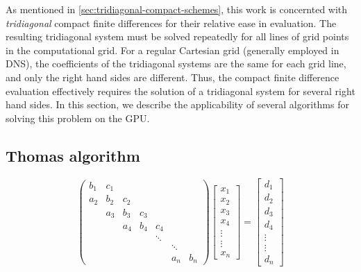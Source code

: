 As mentioned in \ref{sec:tridiagonal-compact-schemes},
this work is concernted with
\emph{tridiagonal} compact finite differences
for their relative ease in evaluation.
The resulting tridiagonal system must be solved
repeatedly for all lines of grid points in the computational grid.
For a regular Cartesian grid (generally employed in DNS),
the coefficients of the tridiagonal systems
are the same for each grid line,
and only the right hand sides are different.
Thus, the compact finite difference evaluation
effectively requires the solution of a tridiagonal system
for several right hand sides.
In this section,
we describe the applicability of several algorithms
for solving this problem on the GPU.

\subsection{Thomas algorithm}

\begin{equation} \label{eqn:general-tridiagonal-system}
\begin{pmatrix}
     b_1 & c_1  \\
     a_2 & b_2  &  c_2  \\
         & a_3  &  b_3 &  c_3  \\
         &      &  a_4 &  b_4 &  c_4  \\
         &      &      &      &  \ddots \\
         &      &      &      &     &  \ddots  \\
         &      &      &      &     &  a_n  &  b_n
\end{pmatrix}
\begin{bmatrix}
    x_1 \\
    x_2 \\
    x_3 \\
    x_4 \\
    \vdots \\
    \vdots \\
    x_n
 \end{bmatrix}
=
\begin{bmatrix}
   d_1 \\
   d_2 \\
   d_3 \\
   d_4 \\
   \vdots \\
   \vdots \\
   d_{n}
\end{bmatrix}
\end{equation}

